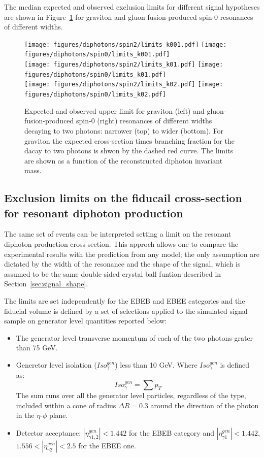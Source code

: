 The median expected and observed exclusion limits for different signal hypotheses are shown in
Figure~\ref{fig:limits} for \RS graviton and gluon-fusion-produced spin-0 resonances of different widths.

\begin{figure}[h!]
  \centering
  \texttt{[image: figures/diphotons/spin2/limits\_k001.pdf]}
  \texttt{[image: figures/diphotons/spin0/limits\_k001.pdf]}\\
  \texttt{[image: figures/diphotons/spin2/limits\_k01.pdf]}
  \texttt{[image: figures/diphotons/spin0/limits\_k01.pdf]}\\
  \texttt{[image: figures/diphotons/spin2/limits\_k02.pdf]}
  \texttt{[image: figures/diphotons/spin0/limits\_k02.pdf]}\\
    \caption{
      Expected and observed upper limit for \RS graviton (left) and gluon-fusion-produced spin-0
      (right) resonances of different widths decaying to two photons:
      narrower (top) to wider (bottom). For \RS graviton the expected cross-section times branching fraction
      for the dacay to two photons is shwon by the dashed red curve. The limits are shown as a function of
      the reconstructed diphoton invariant mass.
    }
    \label{fig:limits}
\end{figure}

\subsection{Exclusion limits on the fiducail cross-section for resonant diphoton production}
The same set of events can be interpreted setting a limit on the resonant diphoton production cross-section.
This approch allows one to compare the experimental results with the prediction from any model; the
only assumption are dictated by the width of the resonance and the shape of the signal, which is assumed to
be the same double-sided crystal ball funtion described in Section~\ref{sec:signal_shape}.

The limits are set independently for the EBEB and EBEE categories and the
fiducial volume is defined by a set of selections applied to the simulated signal sample on generator
level quantities reported below:
\begin{itemize}
\item The generator level transverse momentum of each of the two photons grater than 75 GeV.
\item Generetor level isolation ($Iso_{\gamma}^{gen}$) less than 10 GeV. Where $Iso_{\gamma}^{gen}$ is defined as:
  \[
    Iso_{\gamma}^{gen} = \sum p_T
  \]
  The sum runs over all the generator level particles, regardless of the type, included within a cone of radius $\Delta R = 0.3$
  around the direction of the photon in the $\eta$-$\phi$ plane.
\item Detector acceptance: $|\eta_{\gamma 1,2}^{gen}| < 1.442$ for the EBEB category and
  $|\eta_{\gamma 1}^{gen}| < 1.442$, $1.556 < |\eta_{\gamma 2}^{gen}| < 2.5$ for the EBEE one.
\end{itemize}

